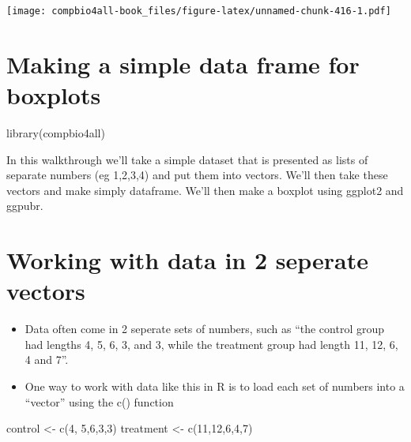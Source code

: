 \documentclass[
]{book}
\newenvironment{Shaded}{\begin{snugshade}}{\end{snugshade}}
\newcommand{\DecValTok}[1]{\textcolor[rgb]{0.00,0.00,0.81}{#1}}
\newcommand{\FunctionTok}[1]{\textcolor[rgb]{0.00,0.00,0.00}{#1}}
\newcommand{\NormalTok}[1]{#1}
\newcommand{\OtherTok}[1]{\textcolor[rgb]{0.56,0.35,0.01}{#1}}
\providecommand{\tightlist}{%
  \setlength{\itemsep}{0pt}\setlength{\parskip}{0pt}}
\begin{document}
\texttt{[image: compbio4all-book\_files/figure-latex/unnamed-chunk-416-1.pdf]}

\hypertarget{making-a-simple-data-frame-for-boxplots}{%
\chapter{Making a simple data frame for boxplots}\label{making-a-simple-data-frame-for-boxplots}}

\begin{Shaded}
\begin{Highlighting}[]
\FunctionTok{library}\NormalTok{(compbio4all)}
\end{Highlighting}
\end{Shaded}

In this walkthrough we'll take a simple dataset that is presented as lists of separate numbers (eg 1,2,3,4) and put them into vectors. We'll then take these vectors and make simply dataframe. We'll then make a boxplot using ggplot2 and ggpubr.

\hypertarget{working-with-data-in-2-seperate-vectors-1}{%
\chapter{Working with data in 2 seperate vectors}\label{working-with-data-in-2-seperate-vectors-1}}

\begin{itemize}
\tightlist
\item
  Data often come in 2 seperate sets of numbers, such as ``the control group had lengths 4, 5, 6, 3, and 3, while the treatment group had length 11, 12, 6, 4 and 7''.
\item
  One way to work with data like this in R is to load each set of numbers into a ``vector'' using the c() function
\end{itemize}

\begin{Shaded}
\begin{Highlighting}[]
\NormalTok{control }\OtherTok{\textless{}{-}}   \FunctionTok{c}\NormalTok{(}\DecValTok{4}\NormalTok{,  }\DecValTok{5}\NormalTok{,}\DecValTok{6}\NormalTok{,}\DecValTok{3}\NormalTok{,}\DecValTok{3}\NormalTok{)}
\NormalTok{treatment }\OtherTok{\textless{}{-}} \FunctionTok{c}\NormalTok{(}\DecValTok{11}\NormalTok{,}\DecValTok{12}\NormalTok{,}\DecValTok{6}\NormalTok{,}\DecValTok{4}\NormalTok{,}\DecValTok{7}\NormalTok{)}
\end{Highlighting}
\end{Shaded}
\end{document}
